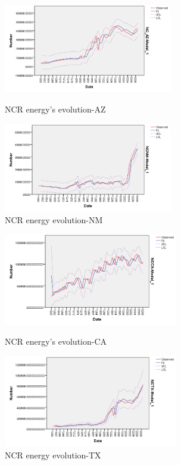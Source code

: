 \documentclass{mcmthesis}
\begin{document}
\begin{figure}
\begin{minipage}[t]{0.5\linewidth}
\centering
\includegraphics[width=2.9in]{./picture/NCRAZ.png}
\caption{NCR energy's evolution-AZ}
\label{fig:left:3}
\end{minipage}
\begin{minipage}[t]{0.5\linewidth}
\centering
\includegraphics[width=2.9in]{./picture/NCRNM.png}
\caption{NCR energy evolution-NM}
\label{fig:right:3}
\end{minipage}
\end{figure}   

\begin{figure}
\begin{minipage}[t]{0.5\linewidth}
\centering
\includegraphics[width=3.0in]{./picture/NCRCA.png}
\caption{NCR energy's evolution-CA}
\label{fig:left:4}
\end{minipage}
\begin{minipage}[t]{0.5\linewidth}
\centering
\includegraphics[width=3in]{./picture/NCRTX.png}
\caption{NCR energy evolution-TX}
\label{fig:right:4}
\end{minipage}
\end{figure}  
\end{document}
